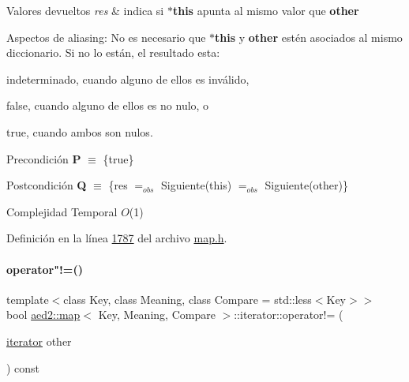\begin{DoxyRetVals}{Valores devueltos}
{\em res} & indica si {\bfseries $\ast$this} apunta al mismo valor que {\bfseries other}\\
\hline
\end{DoxyRetVals}
\begin{DoxyParagraph}{Aspectos de aliasing\+:}
No es necesario que {\bfseries $\ast$this} y {\bfseries other} estén asociados al mismo diccionario. Si no lo están, el resultado esta\+:
\begin{DoxyItemize}
\item indeterminado, cuando alguno de ellos es inválido,
\item false, cuando alguno de ellos es no nulo, o
\item true, cuando ambos son nulos.
\end{DoxyItemize}
\end{DoxyParagraph}
\begin{DoxyPrecond}{Precondición}
{\bfseries P} $\equiv$ \{true\} 
\end{DoxyPrecond}
\begin{DoxyPostcond}{Postcondición}
{\bfseries Q} $\equiv$ \{res $=_{obs}$ Siguiente(this) $=_{obs}$ Siguiente(other)\}
\end{DoxyPostcond}

\begin{DoxyDescription}
\item[Complejidad Temporal]$O$(1)
\end{DoxyDescription}

Definición en la línea \hyperlink{map_8h_source_l01787}{1787} del archivo \hyperlink{map_8h_source}{map.\+h}.

\mbox{\label{classaed2_1_1map_1_1iterator_a748cdf8c35707d1c2e9ef8ef9d862d37_a748cdf8c35707d1c2e9ef8ef9d862d37}} 
\paragraph{\texorpdfstring{operator"!=()}{operator!=()}}
{\footnotesize\ttfamily template$<$class Key, class Meaning, class Compare = std\+::less$<$\+Key$>$$>$ \\
bool \hyperlink{classaed2_1_1map}{aed2\+::map}$<$ Key, Meaning, Compare $>$\+::iterator\+::operator!= (\begin{DoxyParamCaption}\item[{\hyperlink{classaed2_1_1map_1_1iterator}{iterator}}]{other }\end{DoxyParamCaption}) const\hspace{0.3cm}{\ttfamily [inline]}}



